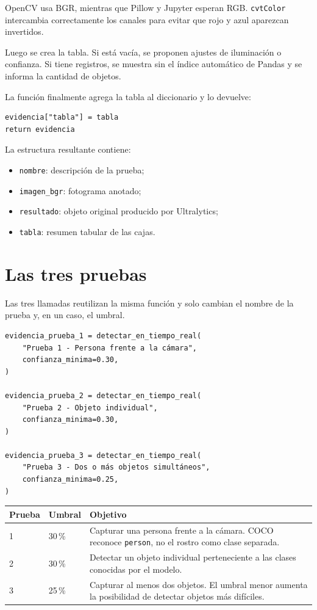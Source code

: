 \documentclass[11pt,a4paper]{article}
\begin{document}
OpenCV usa BGR, mientras que Pillow y Jupyter esperan RGB.
\texttt{cvtColor} intercambia correctamente los canales para evitar que rojo
y azul aparezcan invertidos.

Luego se crea la tabla. Si está vacía, se proponen ajustes de iluminación o
confianza. Si tiene registros, se muestra sin el índice automático de Pandas y
se informa la cantidad de objetos.

La función finalmente agrega la tabla al diccionario y lo devuelve:

\begin{lstlisting}
evidencia["tabla"] = tabla
return evidencia
\end{lstlisting}

La estructura resultante contiene:

\begin{itemize}
  \item \texttt{nombre}: descripción de la prueba;
  \item \texttt{imagen\_bgr}: fotograma anotado;
  \item \texttt{resultado}: objeto original producido por Ultralytics;
  \item \texttt{tabla}: resumen tabular de las cajas.
\end{itemize}

\section{Las tres pruebas}

Las tres llamadas reutilizan la misma función y solo cambian el nombre de la
prueba y, en un caso, el umbral.

\begin{lstlisting}
evidencia_prueba_1 = detectar_en_tiempo_real(
    "Prueba 1 - Persona frente a la cámara",
    confianza_minima=0.30,
)

evidencia_prueba_2 = detectar_en_tiempo_real(
    "Prueba 2 - Objeto individual",
    confianza_minima=0.30,
)

evidencia_prueba_3 = detectar_en_tiempo_real(
    "Prueba 3 - Dos o más objetos simultáneos",
    confianza_minima=0.25,
)
\end{lstlisting}

\begin{tabularx}{\textwidth}{p{} p{} X}
\toprule
\textbf{Prueba} & \textbf{Umbral} & \textbf{Objetivo} \\
\midrule
1 & 30\,\% & Capturar una persona frente a la cámara. COCO reconoce
\texttt{person}, no el rostro como clase separada. \\
2 & 30\,\% & Detectar un objeto individual perteneciente a las clases
conocidas por el modelo. \\
3 & 25\,\% & Capturar al menos dos objetos. El umbral menor aumenta la
posibilidad de detectar objetos más difíciles. \\
\bottomrule
\end{tabularx}
\end{document}
